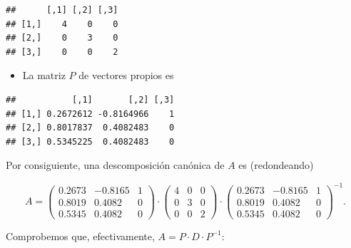\documentclass[]{book}
\newenvironment{Shaded}{\begin{snugshade}}{\end{snugshade}}
\newcommand{\KeywordTok}[1]{\textcolor[rgb]{0.13,0.29,0.53}{\textbf{#1}}}
\newcommand{\NormalTok}[1]{#1}
\newcommand{\OperatorTok}[1]{\textcolor[rgb]{0.81,0.36,0.00}{\textbf{#1}}}
\providecommand{\tightlist}{%
  \setlength{\itemsep}{0pt}\setlength{\parskip}{0pt}}
\theoremstyle{definition}
\theoremstyle{definition}
\theoremstyle{definition}
\theoremstyle{remark}
\begin{document}
\begin{Shaded}
\end{Shaded}

\begin{verbatim}
##      [,1] [,2] [,3]
## [1,]    4    0    0
## [2,]    0    3    0
## [3,]    0    0    2
\end{verbatim}

\begin{itemize}
\tightlist
\item
  La matriz \(P\) de vectores propios es
\end{itemize}

\begin{Shaded}
\end{Shaded}

\begin{verbatim}
##           [,1]       [,2] [,3]
## [1,] 0.2672612 -0.8164966    1
## [2,] 0.8017837  0.4082483    0
## [3,] 0.5345225  0.4082483    0
\end{verbatim}

Por consiguiente, una descomposición canónica de \(A\) es (redondeando)

\[
A=\left(\begin{array}{ccc}
0.2673 & -0.8165 & 1\\
0.8019 & 0.4082 & 0\\
0.5345 & 0.4082 & 0
\end{array}
\right)\!\cdot\!
\left(\begin{array}{ccc}
4 & 0 & 0 \\ 0 & 3 & 0\\ 0 & 0 & 2 \end{array}
\right)\!\cdot\!
\left(\begin{array}{ccc}
0.2673 & -0.8165 & 1\\
0.8019 & 0.4082 & 0\\
0.5345 & 0.4082 & 0
\end{array}
\right)^{-1}.
\]

Comprobemos que, efectivamente, \(A=P\cdot D\cdot P^{-1}\):
\end{document}
